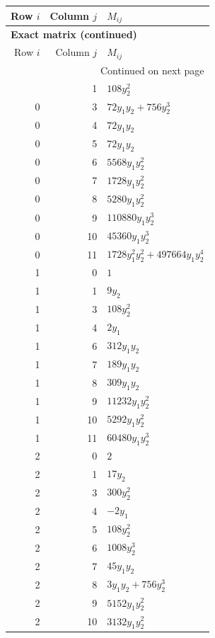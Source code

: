 \documentclass[10pt,a4paper]{article}
\begin{document}
{\small\setlength{\tabcolsep}{7pt}\begin{longtable}{rrp{125mm}}
\toprule Row $i$ & Column $j$ & $M_{ij}$\\\midrule\endfirsthead
\multicolumn{3}{l}{\textbf{Exact matrix (continued)}}\\
\toprule Row $i$ & Column $j$ & $M_{ij}$\\\midrule\endhead
\midrule\multicolumn{3}{r}{Continued on next page}\\\endfoot\bottomrule\endlastfoot
0 & 1 & $108 y_{2}^{2}$\\
0 & 3 & $72 y_{1} y_{2} + 756 y_{2}^{3}$\\
0 & 4 & $72 y_{1} y_{2}$\\
0 & 5 & $72 y_{1} y_{2}$\\
0 & 6 & $5568 y_{1} y_{2}^{2}$\\
0 & 7 & $1728 y_{1} y_{2}^{2}$\\
0 & 8 & $5280 y_{1} y_{2}^{2}$\\
0 & 9 & $110880 y_{1} y_{2}^{3}$\\
0 & 10 & $45360 y_{1} y_{2}^{3}$\\
0 & 11 & $1728 y_{1}^{2} y_{2}^{2} + 497664 y_{1} y_{2}^{4}$\\
1 & 0 & $1$\\
1 & 1 & $9 y_{2}$\\
1 & 3 & $108 y_{2}^{2}$\\
1 & 4 & $2 y_{1}$\\
1 & 6 & $312 y_{1} y_{2}$\\
1 & 7 & $189 y_{1} y_{2}$\\
1 & 8 & $309 y_{1} y_{2}$\\
1 & 9 & $11232 y_{1} y_{2}^{2}$\\
1 & 10 & $5292 y_{1} y_{2}^{2}$\\
1 & 11 & $60480 y_{1} y_{2}^{3}$\\
2 & 0 & $2$\\
2 & 1 & $17 y_{2}$\\
2 & 3 & $300 y_{2}^{2}$\\
2 & 4 & $- 2 y_{1}$\\
2 & 5 & $108 y_{2}^{2}$\\
2 & 6 & $1008 y_{2}^{3}$\\
2 & 7 & $45 y_{1} y_{2}$\\
2 & 8 & $3 y_{1} y_{2} + 756 y_{2}^{3}$\\
2 & 9 & $5152 y_{1} y_{2}^{2}$\\
2 & 10 & $3132 y_{1} y_{2}^{2}$\\

\end{longtable}}
\end{document}
